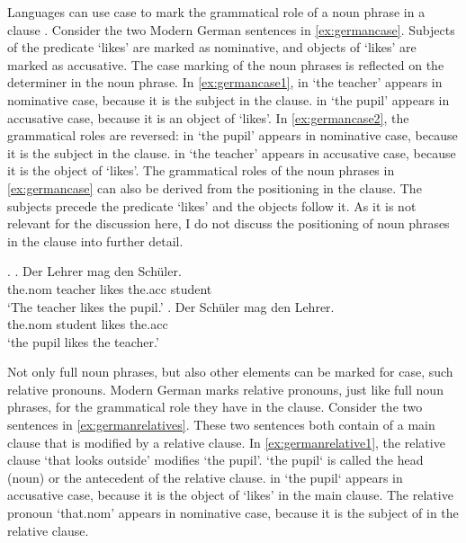 Languages can use case to mark the grammatical role of a noun phrase in a clause \citep{moravcsik2009}. Consider the two Modern German sentences in \ref{ex:germancase}. Subjects of the predicate  `likes' are marked as nominative, and objects of  `likes' are marked as accusative. The case marking of the noun phrases is reflected on the determiner in the noun phrase.
In \ref{ex:germancase1},  in  `the teacher' appears in nominative case, because it is the subject in the clause.  in  `the pupil' appears in accusative case, because it is an object of  `likes'.
In \ref{ex:germancase2}, the grammatical roles are reversed:  in  `the pupil' appears in nominative case, because it is the subject in the clause.  in  `the teacher' appears in accusative case, because it is the object of  `likes'.
The grammatical roles of the noun phrases in \ref{ex:germancase} can also be derived from the positioning in the clause. The subjects precede the predicate  `likes' and the objects follow it. As it is not relevant for the discussion here, I do not discuss the positioning of noun phrases in the clause into further detail.

\ex.\label{ex:germancase}
\ag. Der Lehrer mag den Schüler.\\
 the.\ac{nom} teacher likes the.\ac{acc} student\\
 `The teacher likes the pupil.'\label{ex:germancase1}
\bg. Der Schüler mag den Lehrer.\\
 the.\ac{nom} student likes the.\ac{acc}\\
 `the pupil likes the teacher.'\label{ex:germancase2}

Not only full noun phrases, but also other elements can be marked for case, such relative pronouns. Modern German marks relative pronouns, just like full noun phrases, for the grammatical role they have in the clause. Consider the two sentences in \ref{ex:germanrelatives}. These two sentences both contain of a main clause that is modified by a relative clause.
In \ref{ex:germanrelative1}, the relative clause  `that looks outside' modifies  `the pupil'.  `the pupil` is called the head (noun) or the antecedent of the relative clause.  in  `the pupil` appears in accusative case, because it is the object of  `likes' in the main clause. The relative pronoun  `that.\ac{nom}' appears in nominative case, because it is the subject of in the relative clause.

